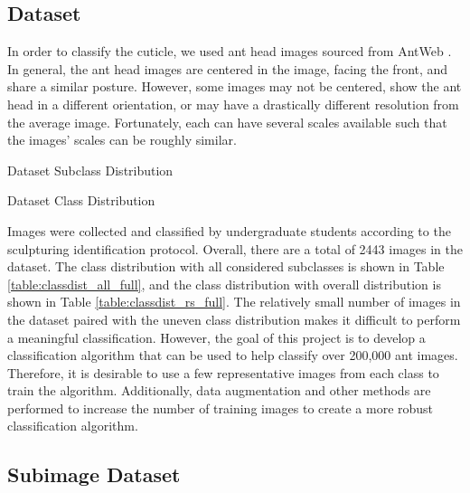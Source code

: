 \documentclass{aci}
\begin{document}
\subsection{Dataset}
In order to classify the cuticle, we used ant head images sourced from AntWeb
\cite{antweb}. In general, the ant head images are centered in the image, facing
the front, and share a similar posture. However, some images may not be
centered, show the ant head in a different orientation, or may have a
drastically different resolution from the average image. Fortunately, each can
have several scales available such that the images' scales can be roughly
similar.

\begin{table}[h]
  \centering
  \caption{Dataset Subclass Distribution}
  \label{table:classdist_all_full}
  
\end{table}

\begin{table}[h]
  \centering
  \caption{Dataset Class Distribution}
  \label{table:classdist_rs_full}
  
\end{table}

Images were collected and classified by undergraduate students according to the
sculpturing identification protocol. Overall, there are a total of 2443 images
in the dataset. The class distribution with all considered subclasses is shown
in Table \ref{table:classdist_all_full}, and the class distribution with overall
distribution is shown in Table \ref{table:classdist_rs_full}. The relatively
small number of images in the dataset paired with the uneven class distribution
makes it difficult to perform a meaningful classification. However, the goal of
this project is to develop a classification algorithm that can be used to help
classify over 200,000 ant images. Therefore, it is desirable to use a few
representative images from each class to train the algorithm. Additionally, data
augmentation and other methods are performed to increase the number of training
images to create a more robust classification algorithm.

\subsection{Subimage Dataset}
\end{document}
